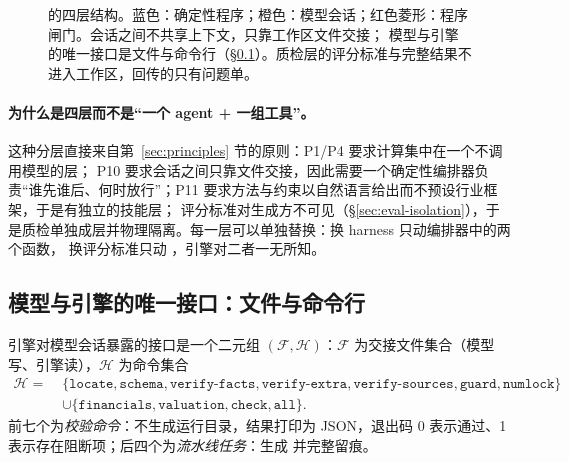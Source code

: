 \begin{figure}[!htbp]
{}
\caption{\sysname{} 的四层结构。蓝色：确定性程序；橙色：模型会话；红色菱形：程序闸门。会话之间不共享上下文，只靠工作区文件交接；
模型与引擎的唯一接口是文件与命令行（\S\ref{sec:arch-interface}）。质检层的评分标准与完整结果不进入工作区，回传的只有问题单。}
\label{fig:arch-layers}
\end{figure}

\paragraph{为什么是四层而不是“一个 agent + 一组工具”。}这种分层直接来自第~\ref{sec:principles} 节的原则：P1/P4 要求计算集中在一个不调用模型的层；
P10 要求会话之间只靠文件交接，因此需要一个确定性编排器负责“谁先谁后、何时放行”；P11 要求方法与约束以自然语言给出而不预设行业框架，于是有独立的技能层；
评分标准对生成方不可见（\S\ref{sec:eval-isolation}），于是质检单独成层并物理隔离。每一层可以单独替换：换 harness 只动编排器中的两个函数，
换评分标准只动 ，引擎对二者一无所知。

\subsection{模型与引擎的唯一接口：文件与命令行}
\label{sec:arch-interface}

\begin{definition}[引擎接口]\label{def:arch-interface}
引擎对模型会话暴露的接口是一个二元组 $(\mathcal{F},\mathcal{H})$：$\mathcal{F}$ 为交接文件集合（模型写、引擎读），$\mathcal{H}$ 为命令集合
\begin{align*}
\mathcal{H}=\;&\{\texttt{locate},\texttt{schema},\texttt{verify-facts},\texttt{verify-extra},\texttt{verify-sources},\texttt{guard},\texttt{numlock}\}\\
&\cup\{\texttt{financials},\texttt{valuation},\texttt{check},\texttt{all}\}.
\end{align*}
前七个为\emph{校验命令}：不生成运行目录，结果打印为 JSON，退出码 0 表示通过、1 表示存在阻断项；后四个为\emph{流水线任务}：生成  并完整留痕。
\end{definition}

